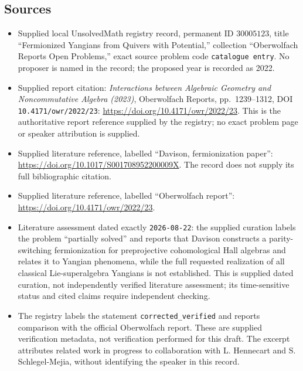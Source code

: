 \documentclass[11pt]{article}
\begin{document}
\subsection{Sources}
\begin{itemize}
\item Supplied local UnsolvedMath registry record, permanent ID \(30005123\), title ``Fermionized Yangians from Quivers with Potential,'' collection ``Oberwolfach Reports Open Problems,'' exact source problem code \texttt{catalogue entry}. No proposer is named in the record; the proposed year is recorded as 2022.
\item Supplied report citation: \emph{Interactions between Algebraic Geometry and Noncommutative Algebra (2023)}, Oberwolfach Reports, pp.\ 1239--1312, DOI \texttt{10.4171/owr/2022/23}: \url{https://doi.org/10.4171/owr/2022/23}. This is the authoritative report reference supplied by the registry; no exact problem page or speaker attribution is supplied.
\item Supplied literature reference, labelled ``Davison, fermionization paper'': \url{https://doi.org/10.1017/S001708952200009X}. The record does not supply its full bibliographic citation.
\item Supplied literature reference, labelled ``Oberwolfach report'': \url{https://doi.org/10.4171/owr/2022/23}.
\item Literature assessment dated exactly \texttt{2026-08-22}: the supplied curation labels the problem ``partially solved'' and reports that Davison constructs a parity-switching fermionization for preprojective cohomological Hall algebras and relates it to Yangian phenomena, while the full requested realization of all classical Lie-superalgebra Yangians is not established. This is supplied dated curation, not independently verified literature assessment; its time-sensitive status and cited claims require independent checking.
\item The registry labels the statement \texttt{corrected\_verified} and reports comparison with the official Oberwolfach report. These are supplied verification metadata, not verification performed for this draft. The excerpt attributes related work in progress to collaboration with L. Hennecart and S. Schlegel-Mejia, without identifying the speaker in this record.
\end{itemize}
\end{document}
